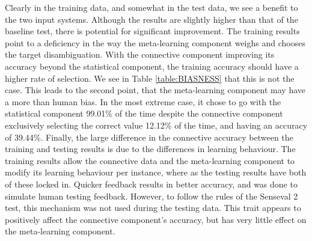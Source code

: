Clearly in the training data, and somewhat in the test data, we see a benefit to
the two input systems. Although the results are slightly higher than that of the
baseline test, there is potential for significant improvement.  The training
results point to a deficiency in the way the meta-learning component weighs and
chooses the target disambiguation.  With the connective component improving its
accuracy beyond the statistical component, the training accuracy should have a
higher rate of selection. We see in Table \ref{table:BIASNESS} that this is not
the case. This leads to the second point, that the meta-learning component may have a
more than human bias.  In the most extreme case, it chose to go with the
statistical component 99.01\% of the time despite the connective component
exclusively selecting the correct value 12.12\% of the time, and having an
accuracy of 39.44\%. Finally, the large difference in the connective accuracy
between the training and testing results is due to the differences in learning
behaviour.  The training results allow the connective data and the meta-learning
component to modify its learning behaviour per instance, where as the testing
results have both of these locked in.  Quicker feedback results in better
accuracy, and was done to simulate human testing feedback. However, to follow
the rules of the Senseval 2 test, this mechanism was not used during the testing
data.  This trait appears to positively affect the connective component's
accuracy, but has very little effect on the meta-learning component.


